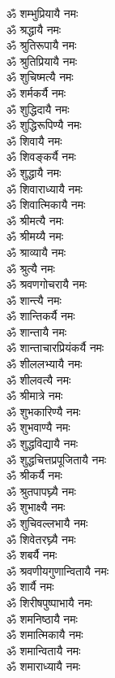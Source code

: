 \begin{flushleft}
\begin{multicols}{2}
ॐ शम्भुप्रियायै नमः\\
ॐ श्रद्धायै नमः\\
ॐ श्रुतिरूपायै नमः\\
ॐ श्रुतिप्रियायै नमः\\
ॐ शुचिष्मत्यै नमः\hfill{}\\
ॐ शर्मकर्यै नमः\\
ॐ शुद्धिदायै नमः\\
ॐ शुद्धिरूपिण्यै नमः\\
ॐ शिवायै नमः\\
ॐ शिवङ्कर्यै नमः\\
ॐ शुद्धायै नमः\\
ॐ शिवाराध्यायै नमः\\
ॐ शिवात्मिकायै नमः\\
ॐ श्रीमत्यै नमः\\
ॐ श्रीमय्यै नमः\hfill{}\\
ॐ श्राव्यायै नमः\\
ॐ श्रुत्यै नमः\\
ॐ श्रवणगोचरायै नमः\\
ॐ शान्त्यै नमः\\
ॐ शान्तिकर्यै नमः\\
ॐ शान्तायै नमः\\
ॐ शान्ताचारप्रियंकर्यै नमः\\
ॐ शीललभ्यायै नमः\\
ॐ शीलवत्यै नमः\\
ॐ श्रीमात्रे नमः\hfill{}\\
ॐ शुभकारिण्यै नमः\\
ॐ शुभवाण्यै नमः\\
ॐ शुद्धविद्यायै नमः\\
ॐ शुद्धचित्तप्रपूजितायै नमः\\
ॐ श्रीकर्यै नमः\\
ॐ श्रुतपापघ्न्यै नमः\\
ॐ शुभाक्ष्यै नमः\\
ॐ शुचिवल्लभायै नमः\\
ॐ शिवेतरघ्न्यै नमः\\
ॐ शबर्यै नमः\hfill{}\\
ॐ श्रवणीयगुणान्वितायै नमः\\
ॐ शार्यै नमः\\
ॐ शिरीषपुष्पाभायै नमः\\
ॐ शमनिष्ठायै नमः\\
ॐ शमात्मिकायै नमः\\
ॐ शमान्वितायै नमः\\
ॐ शमाराध्यायै नमः\\

\end{multicols}
\end{flushleft}

